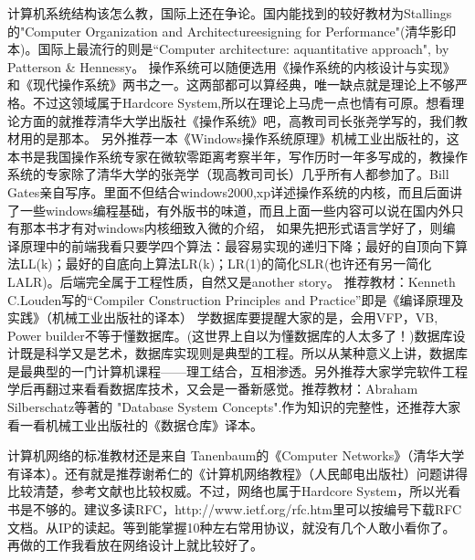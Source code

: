 计算机系统结构该怎么教，国际上还在争论。国内能找到的较好教材为Stallings的"Computer Organization and Architectureesigning for Performance"(清华影印
本)。国际上最流行的则是“Computer architecture: aquantitative approach", by Patterson \& Hennessy。
操作系统可以随便选用《操作系统的内核设计与实现》和《现代操作系统》两书之一。这两部都可以算经典，唯一缺点就是理论上不够严格。不过这领域属于Hardcore System,所以在理论上马虎一点也情有可原。想看理论方面的就推荐清华大学出版社《操作系统》吧，高教司司长张尧学写的，我们教材用的是那本。 另外推荐一本《Windows操作系统原理》机械工业出版社的，这本书是我国操作系统专家在微软零距离考察半年，写作历时一年多写成的，教操作系统的专家除了清华大学的张尧学（现高教司司长）几乎所有人都参加了。Bill Gates亲自写序。里面不但结合windows2000,xp详述操作系统的内核，而且后面讲了一些windows编程基础，有外版书的味道，而且上面一些内容可以说在国内外只有那本书才有对windows内核细致入微的介绍，
如果先把形式语言学好了，则编译原理中的前端我看只要学四个算法：最容易实现的递归下降；最好的自顶向下算法LL(k)；最好的自底向上算法LR(k)；LR(1)的简化SLR(也许还有另一简化LALR)。后端完全属于工程性质，自然又是another story。
推荐教材：Kenneth C.Louden写的“Compiler Construction Principles and Practice”即是《编译原理及实践》（机械工业出版社的译本）
学数据库要提醒大家的是，会用VFP，VB, Power builder不等于懂数据库。(这世界上自以为懂数据库的人太多了！)数据库设计既是科学又是艺术，数据库实现则是典型的工程。所以从某种意义上讲，数据库是最典型的一门计算机课程——理工结合，互相渗透。另外推荐大家学完软件工程学后再翻过来看看数据库技术，又会是一番新感觉。推荐教材：Abraham Silberschatz等著的 "Database System Concepts".作为知识的完整性，还推荐大家看一看机械工业出版社的《数据仓库》译本。

计算机网络的标准教材还是来自 Tanenbaum的《Computer Networks》（清华大学有译本）。还有就是推荐谢希仁的《计算机网络教程》（人民邮电出版社）问题讲得比较清楚，参考文献也比较权威。不过，网络也属于Hardcore System，所以光看书是不够的。建议多读RFC，http://www.ietf.org/rfc.htm里可以按编号下载RFC文档。从IP的读起。等到能掌握10种左右常用协议，就没有几个人敢小看你了。再做的工作我看放在网络设计上就比较好了。

